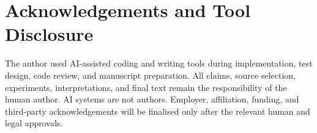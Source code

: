 \documentclass[10pt]{article}
\begin{document}
\section*{Acknowledgements and Tool Disclosure}
The author used AI-assisted coding and writing tools during implementation, test design, code review, and manuscript preparation. All claims, source selection, experiments, interpretations, and final text remain the responsibility of the human author. AI systems are not authors. Employer, affiliation, funding, and third-party acknowledgements will be finalised only after the relevant human and legal approvals.



\end{document}
